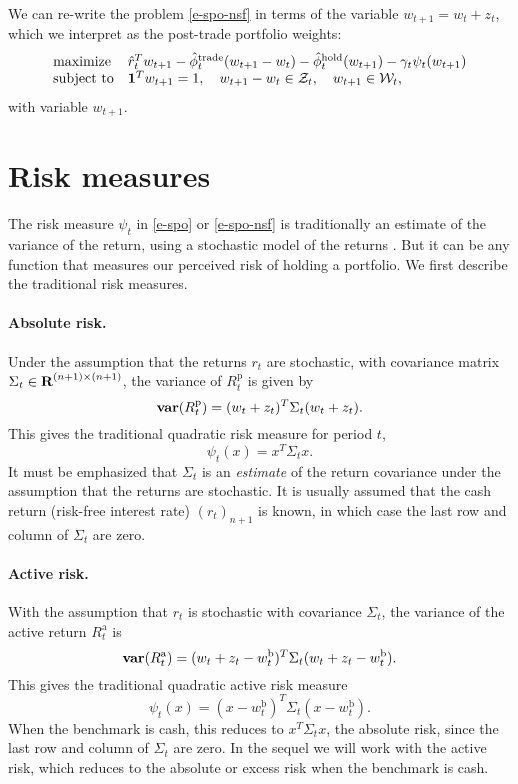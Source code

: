 \documentclass[openany]{now}
\newcommand{\trcosthat}{\hat \phi^\mathrm{trade}}
\newcommand{\hldcosthat}{\hat \phi^\mathrm{hold}}
\newcommand{\Rp}{R^\mathrm{p}}
\newcommand{\Rap}{R^\mathrm{a}}
\newcommand{\wb}{w^\mathrm{b}}
\begin{document}
We can re-write the problem \eqref{e-spo-nsf} in terms of
the variable $w_{t+1} = w_t +z_t$, which we interpret as the post-trade
portfolio weights:
\begin{equation}\label{e-spo-wt}
\begin{array}{ll}
\mbox{maximize} &
\hat r_t^T w_{t+1}
- \trcosthat_t (w_{t+1}-w_t) - \hldcosthat_t (w_{t+1})
-\gamma_t \psi_t(w_{t+1})\\
\mbox{subject to} &
\ones^Tw_{t+1} = 1, \quad w_{t+1}-w_t \in \mathcal Z_t, \quad
w_{t+1} \in \mathcal W_t,
\end{array}
\end{equation}
with variable $w_{t+1}$.

\section{Risk measures}
\label{s-risk-measures}
The risk measure $\psi_t$ in \eqref{e-spo} or \eqref{e-spo-nsf}
is traditionally an estimate of the variance of the return,
using a stochastic model of the returns \cite{markowitz1952portfolio, kolm2014years}.
But it can be any function that measures our perceived
risk of holding a portfolio.
We first describe the traditional risk measures.

\paragraph{Absolute risk.}
Under the assumption that the returns $r_t$ are stochastic, with
covariance matrix $\Sigma_t \in {\mbox{\bf R}}^{(n+1)\times (n+1)}$,
the variance of $\Rp_t$ is given by
\[
\var(\Rp_t) = (w_t + z_t)^T \Sigma_t (w_t +z_t ).
\]
This gives the traditional quadratic risk measure for period $t$,
\[
\psi_t(x) = x^T \Sigma_t x.
\]
It must be emphasized that $\Sigma_t$ is an \emph{estimate} of the
return covariance under the assumption that the returns are stochastic.
It is usually assumed that the cash return (risk-free interest rate)
$(r_t)_{n+1}$ is known, in which case the last row and column of $\Sigma_t$ are zero.

\paragraph{Active risk.}
With the assumption that $r_t$ is stochastic with covariance $\Sigma_t$,
the variance of the active return $\Rap_t$ is
\[
\var(\Rap_t) = (w_t + z_t - \wb_t)^T\Sigma_t(w_t+z_t-\wb_t).
\]
This gives the traditional quadratic active risk measure
\[
\psi_t(x) = (x-\wb_t)^T\Sigma_t(x-\wb_t).
\]
When the benchmark is cash, this reduces to $x^T\Sigma_t x$, the absolute risk,
since the last row and column of $\Sigma_t$ are zero.
In the sequel we will work with the active risk,
which reduces to the absolute or excess risk when the benchmark is cash.
\end{document}

